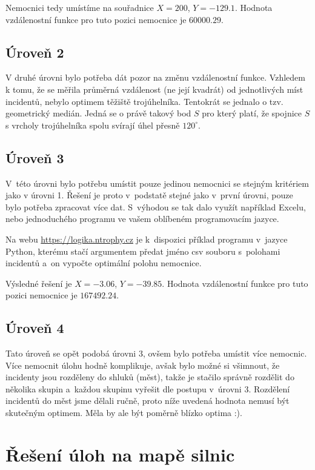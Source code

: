 \documentclass[12pt,a4paper]{article}
\begin{document}
Nemocnici tedy umístíme na souřadnice $X=200$, $Y=-129.1$. Hodnota vzdálenostní
funkce pro tuto pozici nemocnice je $60000.29$.

\subsection*{Úroveň 2}
V druhé úrovni bylo potřeba dát pozor na změnu vzdálenostní funkce. Vzhledem k tomu, že se měřila průměrná vzdálenost (ne její kvadrát) od jednotlivých míst incidentů,
nebylo optimem těžiště trojúhelníka. Tentokrát se jednalo o tzv. geometrický medián. Jedná se o právě takový bod $S$ pro který platí, že spojnice $S$ s vrcholy trojúhelníka spolu svírají úhel přesně $120^\circ$.

\subsection*{Úroveň 3}
V~této úrovni bylo potřebu umístit pouze jedinou nemocnici se stejným kritériem
jako v úrovni 1. Řešení je proto v~podstatě stejné jako v~první úrovni, pouze
bylo potřeba zpracovat více dat. S~výhodou se tak dalo využít například Excelu,
nebo jednoduchého programu ve vašem oblíbeném programovacím jazyce.

Na webu \url{https://logika.ntrophy.cz} je k~dispozici příklad programu
v~jazyce Python, kterému stačí argumentem předat jméno csv souboru s~polohami
incidentů a~on vypočte optimální polohu nemocnice.

Výsledné řešení je $X=-3.06$, $Y=-39.85$. Hodnota vzdálenostní funkce pro tuto
pozici nemocnice je $167492.24$.

\subsection*{Úroveň 4}
Tato úroveň se opět podobá úrovni 3, ovšem bylo potřeba umístit více nemocnic.
Více nemocnit úlohu hodně komplikuje, avšak bylo možné si všimnout, že
incidenty jsou rozděleny do shluků (měst), takže je stačilo správně rozdělit do
několika skupin a~každou skupinu vyřešit dle postupu v~úrovni 3. Rozdělení
incidentů do měst jsme dělali ručně, proto níže uvedená hodnota nemusí být
skutečným optimem. Měla by ale být poměrně blízko optima :).

\section*{Řešení úloh na mapě silnic}
\end{document}
